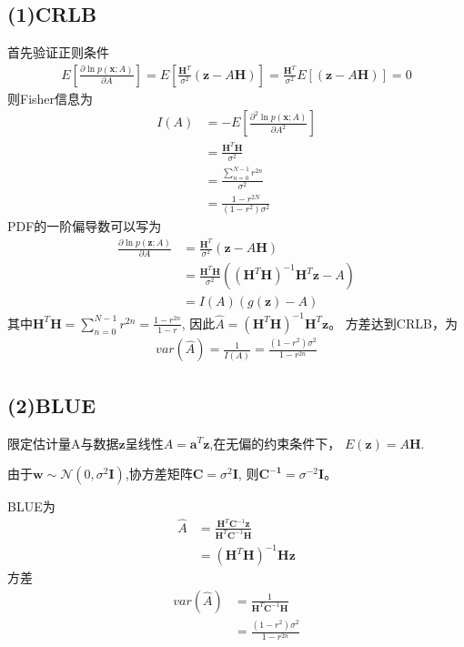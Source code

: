 \documentclass[fontset=windows]{article}
\numberwithin{figure}{section}
\begin{document}
\subsection*{(1)CRLB}

首先验证正则条件
\begin{align*}
    E\left[\frac{\partial \ln p(\mathbf{x};A)}{\partial A}\right]
    =E\left[\frac{\mathbf{H}^T}{\sigma^2}(\mathbf{z}-A\mathbf{H})\right]
    =\frac{\mathbf{H}^T}{\sigma^2}E\left[(\mathbf{z}-A\mathbf{H})\right]=0
\end{align*}
则Fisher信息为
\begin{align*}
    I(A) & =-E\left[\frac{\partial^2  \ln p(\mathbf{x};A)}{\partial A^2}\right] \\
         & =\frac{\mathbf{H}^T\mathbf{H}}{\sigma^2}                             \\
         & =\frac{\sum_{n=0}^{N-1}r^{2n}}{\sigma^2}                             \\
         & =\frac{1-r^{2N}}{(1-r^2)\sigma^2}
\end{align*}
PDF的一阶偏导数可以写为
\begin{align*}
    \frac{\partial \ln p(\mathbf{z};A)}{\partial A}
     & =\frac{\mathbf{H}^T}{\sigma^2}(\mathbf{z}-A\mathbf{H}) \\
     & =\frac{\mathbf{H}^T\mathbf{H}}{\sigma^2}
    ((\mathbf{H}^T\mathbf{H})^{-1}\mathbf{H}^T\mathbf{z}-A)   \\
     & =I(A)(g(\mathbf{z})-A)
\end{align*}
其中\(\mathbf{H}^T\mathbf{H}=\sum_{n=0}^{N-1}r^{2n}=\frac{1-r^{2n}}{1-r}\),
因此\(\hat{A}=(\mathbf{H}^T\mathbf{H})^{-1}\mathbf{H}^T\mathbf{z}\)。
方差达到CRLB，为
\begin{align*}
    var(\hat{A})=\frac{1}{I(A)}=\frac{(1-r^2)\sigma^2}{1-r^{2n}}
\end{align*}
\subsection*{(2)BLUE}

限定估计量A与数据\(\mathbf{z}\)呈线性\(A=\mathbf{a}^T\mathbf{z}\),在无偏的约束条件下，
\(E(\mathbf{z})=A\mathbf{H}\).

由于\(\mathbf{w}\sim \mathcal{N}(0,\sigma^2\mathbf{I})\),协方差矩阵\(\mathbf{C}=\sigma^2 \mathbf{I}\),
则\(\mathbf{C^{-1}}=\sigma^{-2}\mathbf{I}\)。

BLUE为
\begin{align*}
    \hat{A}
     & =\frac{\mathbf{H}^T \mathbf{C}^{-1}\mathbf{z}}{\mathbf{H}^T\mathbf{C}^{-1}\mathbf{H}} \\
     & =(\mathbf{H}^T \mathbf{H})^{-1}\mathbf{H}\mathbf{z}
\end{align*}
方差
\begin{align*}
    var(\hat{A})
     & =\frac{1}{\mathbf{H}^T \mathbf{C}^{-1} \mathbf{H}} \\
     & =\frac{(1-r^2)\sigma^2}{1-r^{2n}}
\end{align*}
\end{document}
